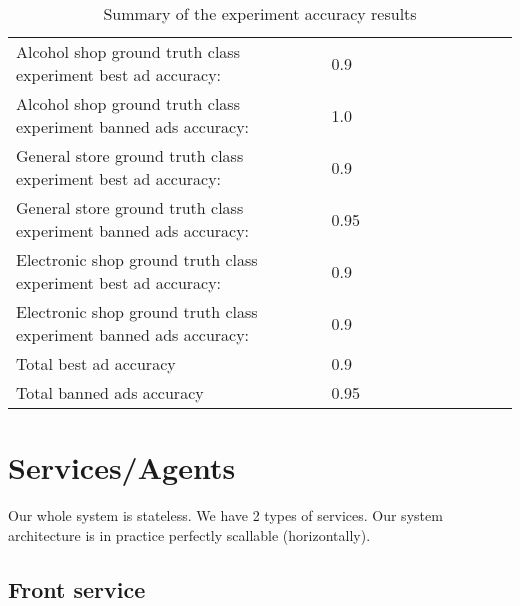 \documentclass[a4paper]{article}
\begin{document}
\begin{table}[!hbt]
    \caption{ Summary of the experiment accuracy results
    \label{table:testResults}
    }
\footnotesize
\begin{center}
    \begin{tabular}{|l|l|l|l|l|l|l|l|l|l|l|}
    \hline
        Alcohol shop ground truth class experiment best ad accuracy:  &
        0.9 \\
        Alcohol shop ground truth class experiment banned ads accuracy: &
        1.0 \\
    \hline
        General store ground truth class experiment best ad accuracy: &
        0.9 \\
        General store ground truth class experiment banned ads accuracy: &
        0.95 \\
    \hline
        Electronic shop ground truth class experiment best ad accuracy: &
        0.9 \\
        Electronic shop ground truth class experiment banned ads accuracy: &
        0.9 \\
    \hline
        Total best ad accuracy & 0.9 \\
        Total banned ads accuracy & 0.95 \\
    \hline
    \end{tabular}
\end{center}
\end{table}


\section{Services/Agents}
Our whole system is stateless.
We have 2 types of services.
Our system architecture is in practice perfectly scallable (horizontally).

\subsection{Front service}
\end{document}
